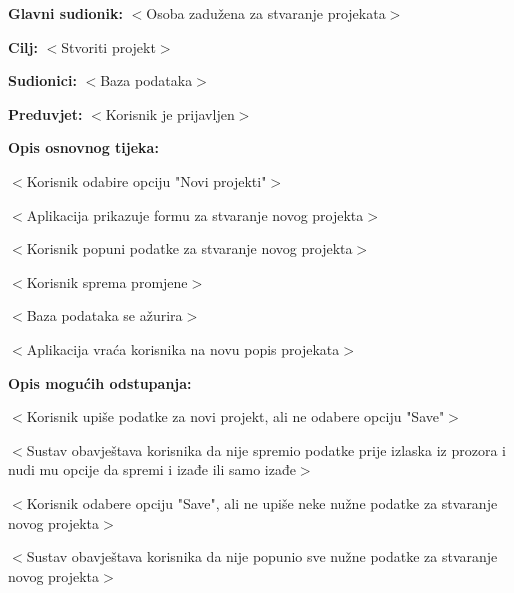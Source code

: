 					\noindent {}
					\begin{packed_item}

						\item \textbf{Glavni sudionik:} $<$Osoba zadužena za stvaranje projekata$>$
						\item \textbf{Cilj:} $<$Stvoriti projekt$>$
						\item \textbf{Sudionici:} $<$Baza podataka$>$
						\item \textbf{Preduvjet:} $<$Korisnik je prijavljen$>$
						\item \textbf{Opis osnovnog tijeka:}

						\item[] \begin{packed_enum}

							\item $<$Korisnik odabire opciju "Novi projekti"$>$
							\item $<$Aplikacija prikazuje formu za stvaranje novog projekta$>$
							\item $<$Korisnik popuni podatke za stvaranje novog projekta$>$
							\item $<$Korisnik sprema promjene$>$
							\item $<$Baza podataka se ažurira$>$
							\item $<$Aplikacija vraća korisnika na novu popis projekata$>$
						\end{packed_enum}

						\item \textbf{Opis mogućih odstupanja:}

						\item[] \begin{packed_item}

							\item[7.a] $<$Korisnik upiše podatke za novi projekt, ali ne odabere opciju "Save"$>$
							\item[] \begin{packed_enum}

								\item $<$Sustav obavještava korisnika da nije spremio podatke prije izlaska
								iz prozora i nudi mu opcije da spremi i izađe ili samo izađe$>$

							\end{packed_enum}

							\item[7.b] $<$Korisnik odabere opciju "Save", ali ne upiše neke nužne podatke za 
							stvaranje novog projekta$>$
							\item[] \begin{packed_enum}

								\item $<$Sustav obavještava korisnika da nije popunio sve nužne podatke za 
								stvaranje novog projekta$>$

							\end{packed_enum}

						\end{packed_item}
					\end{packed_item}

